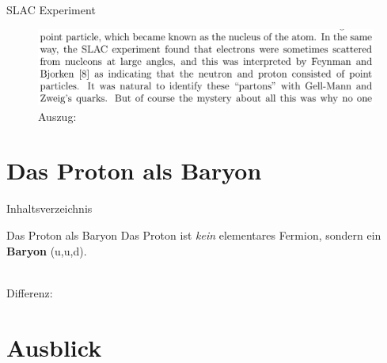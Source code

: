 \documentclass[t,9pt]{beamer}
\begin{document}
        \begin{frame}{SLAC Experiment}
                \begin{figure}
                        \includegraphics[width=\textwidth]{prosi_making_of_standard_model_identify_partons_quarks.png}
                        \caption{Auszug:\cite{Weinberg2004}}
                \end{figure}
        \end{frame}

        \section{Das Proton als Baryon}

        \begin{frame}{Inhaltsverzeichnis}
                \tableofcontents[currentsection]
        \end{frame}

        \begin{frame}{Das Proton als Baryon}
                \pause
                Das Proton ist \textit{kein} elementares Fermion, sondern ein \textbf{Baryon} (u,u,d).
                \pause
                \begin{center}
                \end{center}
                \tiny\vspace{-.2cm}\hspace{8cm}\cite{CODATA_proton_magneton}\normalsize
                \pause
                \\ Differenz: 
                \begin{center}
                \end{center}
        \end{frame}

        \section{Ausblick}
\end{document}
